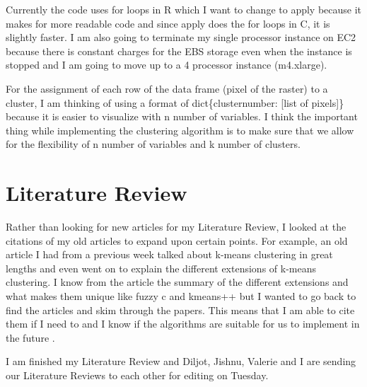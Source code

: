 \documentclass[a4paper,10pt]{article}
\begin{document}
Currently the code uses for loops in R which I want to change to apply because it makes for more readable code and since 
apply does the for loops in C, it is slightly faster. I am also going to terminate my single processor instance on EC2 
because there is constant charges for the EBS storage even when the instance is stopped and I am going to move up to a 
4 processor instance (m4.xlarge).

For the assignment of each row of the data frame (pixel of the raster) to a cluster, I am thinking of using a format of 
dict\{clusternumber: [list of pixels]\} because it is easier to visualize with n number of variables. I think the important 
thing while implementing the clustering algorithm is to make sure that we allow for the flexibility of n number of variables 
and k number of clusters.

\section{Literature Review}
Rather than looking for new articles for my Literature Review, I looked at the citations of my old articles to expand upon 
certain points. For example, an old article I had from a previous week \cite{jain2010data}
talked about k-means clustering in great lengths and even went on to explain the different extensions of k-means clustering.
I know from the article the summary of the different extensions and what makes them unique like fuzzy c and kmeans++ but I 
wanted to go back to find the articles and skim through the papers. This means that I am able to cite them if I need to and 
I know if the algorithms are suitable for us to implement in the future \cite{dunn1973a,pelleg1999accelerating,scholkopf1998nonlinear}.

I am finished my Literature Review and Diljot, Jishnu, Valerie and I are sending our Literature Reviews to each other for 
editing on Tuesday.





\end{document}
